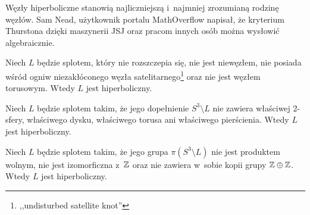 Węzły hiperboliczne stanowią najliczniejszą i~najmniej zrozumianą rodzinę węzłów.
Sam Nead, użytkownik portalu MathOverflow napisał, że kryterium Thurstona dzięki maszynerii JSJ oraz pracom innych osób można wysłowić algebraicznie.
%

\begin{proposition}
    Niech $L$ będzie splotem, który nie rozszczepia się, nie jest niewęzłem, nie posiada wśród ogniw niezakłóconego węzła satelitarnego\footnote{,,undisturbed satellite knot''} oraz nie jest węzłem torusowym.
%
    Wtedy $L$ jest hiperboliczny.
\end{proposition}

\begin{proposition}
    Niech $L$ będzie splotem takim, że jego dopełnienie $S^3 \setminus L$ nie zawiera właściwej 2-sfery, właściwego dysku, właściwego torusa ani właściwego pierścienia.
    Wtedy $L$ jest hiperboliczny.
\end{proposition}

\begin{proposition}
    Niech $L$ będzie splotem takim, że jego grupa $\pi(S^3 \setminus L)$ nie jest produktem wolnym, nie jest izomorficzna z~$\mathbb Z$ oraz nie zawiera w~sobie kopii grupy $\mathbb Z \oplus \mathbb Z$.
    Wtedy $L$ jest hiperboliczny.
\end{proposition}

